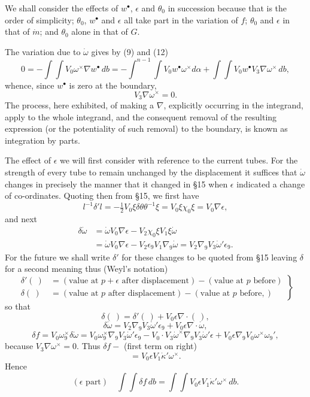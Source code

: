 \documentclass[11pt]{article}
\begin{document}
\indent We shall consider the effects of $w^\bullet$, $\epsilon$ and $\theta_0$ in succession because that is the order of simplicity; $\theta_0$, $w^\bullet$ and $\epsilon$ all take part in the variation of $f$; $\theta_0$ and $\epsilon$ in that of $\dot m$; and $\theta_0$ alone in that of $G$.

\indent The variation due to $\dot\omega$ gives by (9) and (12)
\[
  0=-\int\!\int V_0\omega^\times\nabla w^\bullet\,db
  =-\int^{n-1}\!\int V_0w^\bullet\omega^\times d\alpha
    +\int\!\int V_0w^\bullet V_3\nabla\omega^\times\,db,
\]
whence, since $w^\bullet$ is zero at the boundary,
\begin{equation}
  V_3\nabla\omega^\times=0.
  \tag{13}
\end{equation}
The process, here exhibited, of making a $\nabla$, explicitly occurring in the integrand, apply to the whole integrand, and the consequent removal of the resulting expression (or the potentiality of such removal) to the boundary, is known as integration by parts.

\indent The effect of $\epsilon$ we will first consider with reference to the current tubes. For the strength of every tube to remain unchanged by the displacement it suffices that $\dot\omega$ changes in precisely the manner that it changed in §15 when $\epsilon$ indicated a change of co-ordinates. Quoting then from §15, we first have
\[
  l^{-1}\delta'l=-\tfrac12V_0\xi\delta\theta\theta^{-1}\xi
  =V_0\xi\chi_0\xi=V_0\nabla\epsilon,
\]
and next
\[
  \begin{aligned}
    \delta\dot\omega&=\dot\omega V_0\nabla\epsilon-V_2\chi_0\xi V_1\xi\dot\omega\\
    &=\dot\omega V_0\nabla\epsilon-V_2\epsilon_9V_1\nabla_9\dot\omega
      =V_2\nabla_9V_3\dot\omega'\epsilon_9.
  \end{aligned}
\]
For the future we shall write $\delta'$ for these changes to be quoted from §15 leaving $\delta$ for a second meaning thus (Weyl's notation)
\begin{equation}
  \left.\begin{aligned}
    \delta'(\ )&=(\text{value at }p+\epsilon\text{ after displacement})-(\text{value at }p\text{ before})\\
    \delta(\ )&=(\text{value at }p\text{ after displacement})-(\text{value at }p\text{ before},)
  \end{aligned}\right\}
  \tag{14}
\end{equation}
so that
\[
  \delta(\ )=\delta'(\ )+V_0\epsilon\nabla\mathbin{\cdot}(\ ),
\]
\[
  \delta\dot\omega=V_2\nabla_9V_3\dot\omega'\epsilon_9+V_0\epsilon\nabla\mathbin{\cdot}\dot\omega,
\]
\[
  \delta f=V_0\omega_9^\times\delta\dot\omega
  =V_0\omega_9^\times\nabla_9V_3\dot\omega'\epsilon_9
   -V_0\mathbin{\cdot}V_3\dot\omega^\times\nabla_9V_3\dot\omega'\epsilon
   +V_0\epsilon\nabla_9V_0\omega^\times\omega_9',
\]
because $V_3\nabla\omega^\times=0$. Thus $\delta f-$ (first term on right)
\[
  =V_0\epsilon V_1\dot\kappa'\omega^\times.
\]
Hence
\begin{equation}
  (\epsilon\text{ part})\quad\int\!\int\delta f\,db
  =\int\!\int V_0\epsilon V_1\dot\kappa'\omega^\times\,db.
  \tag{15}
\end{equation}
\end{document}
